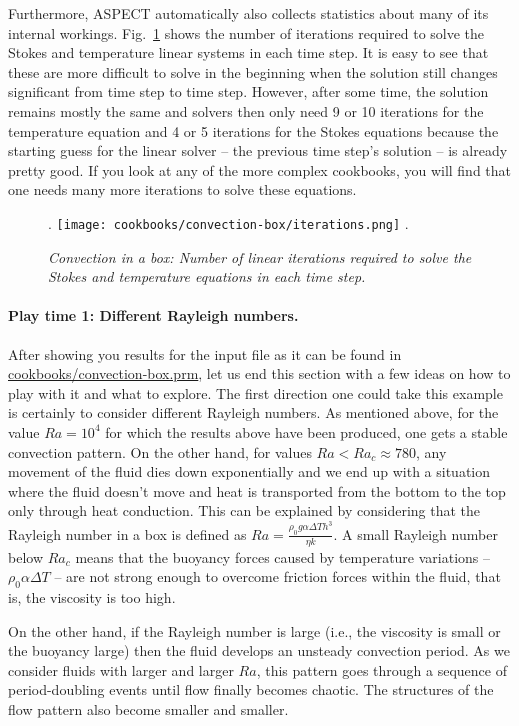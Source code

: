 \documentclass{article}
\newcommand{\aspect}{\textsc{ASPECT}}
\begin{document}
Furthermore, \aspect{} automatically also collects statistics about many of its
internal workings. Fig.~\ref{fig:convection-box-iterations} shows the number of
iterations required to solve the Stokes and temperature linear systems in each
time step. It is easy to see that these are more difficult to solve in the
beginning when the solution still changes significant from time step to time
step. However, after some time, the solution remains mostly the same and solvers
then only need 9 or 10 iterations for the temperature equation and 4 or 5
iterations for the Stokes equations because the starting guess for the linear
solver -- the previous time step's solution -- is already pretty good. If you
look at any of the more complex cookbooks, you will find that one needs many
more iterations to solve these equations.

\begin{figure}
\phantom.
\hfill
\texttt{[image: cookbooks/convection-box/iterations.png]}
\hfill
\phantom.
\caption{\it Convection in a box: Number of linear iterations required to solve
the Stokes and temperature equations in each time step.}
\label{fig:convection-box-iterations}
\end{figure}


\paragraph{Play time 1: Different Rayleigh numbers.} After showing you results
for the input file as it can be found in \url{cookbooks/convection-box.prm}, let us
end this section with a few ideas on how to play with it and what to explore.
The first direction one could take this example is certainly to consider
different Rayleigh numbers. As mentioned above, for the value $Ra=10^4$ for
which the results above have been produced, one gets a stable convection
pattern. On the other hand, for values $Ra<Ra_c\approx 780$, any movement of
the fluid dies down exponentially and we end up with a situation where the fluid
doesn't move and heat is transported from the bottom to the top only through
heat conduction. This can be explained by considering that the Rayleigh number
in a box is defined as $Ra=\frac{\rho_0 g\alpha\Delta T h^3}{\eta k}$. A small
Rayleigh number below $Ra_c$ means that the buoyancy forces 
caused by temperature variations 
-- $\rho_0 \alpha \Delta T$ -- are not strong enough to overcome friction forces within the fluid, that is, the viscosity is too high.

On the other hand, if the Rayleigh number is large (i.e., the viscosity is
small or the buoyancy large) then the fluid develops an unsteady convection
period. As we consider fluids with larger and larger $Ra$, this pattern goes
through a sequence of period-doubling events until flow finally becomes chaotic.
The structures of the flow pattern also become smaller and smaller.
\end{document}
